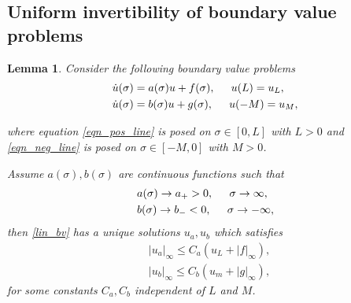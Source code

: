 \documentclass[letterpaper,11pt]{article}
\numberwithin{equation}{section}
\theoremstyle{plain}
\newtheorem{lemma}[theorem]{Lemma}
\begin{document}
\subsection{Uniform invertibility of boundary value problems }
\begin{lemma}\label{pert_inv}
Consider the following boundary value problems 
\begin{subequations}
\label{lin_bv}
\begin{align}
       &\dot{u}(\sigma) = a(\sigma) u + f(\sigma), \hspace{0.2in} u(L)= u_L,         \label{eqn_pos_line}  \\
              &\dot{u}(\sigma) = b(\sigma) u + g(\sigma), \hspace{0.2in} u(-M)= u_M,         \label{eqn_neg_line}
\end{align}
\end{subequations}

where equation \eqref{eqn_pos_line} is posed on $\sigma \in [0,L]$ with $L>0$ and \eqref{eqn_neg_line} is posed on $\sigma \in [-M,0]$ with $M>0$. 

Assume $a(\sigma), b(\sigma)$ are continuous functions such that 
\begin{subequations}
\label{ode_asy}
\begin{align}
       &a(\sigma) \to a_+>0, \hspace{0.2in} \sigma \to \infty      ,  \label{ode_asy_a}  \\
       &b(\sigma) \to b_- < 0, \hspace{0.2in} \sigma \to -\infty,         \label{ode_asy_b}
\end{align}
\end{subequations}
then \eqref{lin_bv} has a unique solutions $u_a,u_b$ which satisfies
\begin{subequations}
\label{ode_est}
\begin{align}
       &|u_a|_\infty \le C_a(u_L+|f|_\infty),  \label{ode_est_a}  \\
       &|u_b|_\infty \le C_b(u_m+|g|_\infty),         \label{ode_est_b}
\end{align}
\end{subequations}
for some constants $C_a, C_b$ independent of $L$ and $M$.
\end{lemma}
\end{document}
